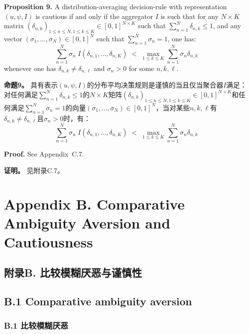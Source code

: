 \documentclass[12pt,a4paper]{article}
\newenvironment{original}
  {\par\noindent\ignorespaces}
  {\par}
\newenvironment{translation}
  {\par\noindent{\color{transblue}\ignorespaces}}
  {\par\medskip}
\begin{document}
\begin{original}
\textbf{Proposition 9.} A distribution-averaging decision-rule with representation $(u, \psi, I)$ is cautious if and only if the aggregator $I$ is such that for any $N \times K$ matrix $(\delta_{n,k})_{1 \leq n \leq N, 1 \leq k \leq K} \in [0,1]^{N \times K}$ such that $\sum_{n=1}^{N} \delta_{n,k} \leq 1$, and any vector $(\sigma_{1}, \dots, \sigma_{N}) \in [0,1]^{N}$ such that $\sum_{n=1}^{N} \sigma_{n} = 1$, one has:
\[
\sum_{n=1}^{N} \sigma_{n} \; I(\delta_{n,1}, \dots, \delta_{n,K}) \; < \; \max_{1 \leq k \leq K} \sum_{n=1}^{N} \sigma_{n} \delta_{n,k}
\]
whenever one has $\delta_{n,k} \neq \delta_{n,\ell}$ and $\sigma_{n} > 0$ for some $n, k, \ell$.
\end{original}

\begin{translation}
\textbf{命题9。} 具有表示$(u, \psi, I)$的分布平均决策规则是谨慎的当且仅当聚合器$I$满足：对任何满足$\sum_{n=1}^{N} \delta_{n,k} \leq 1$的$N \times K$矩阵$(\delta_{n,k})_{1 \leq n \leq N, 1 \leq k \leq K} \in [0,1]^{N \times K}$和任何满足$\sum_{n=1}^{N} \sigma_{n} = 1$的向量$(\sigma_{1}, \dots, \sigma_{N}) \in [0,1]^{N}$，当对某些$n, k, \ell$有$\delta_{n,k} \neq \delta_{n,\ell}$且$\sigma_{n} > 0$时，有：
\[
\sum_{n=1}^{N} \sigma_{n} \; I(\delta_{n,1}, \dots, \delta_{n,K}) \; < \; \max_{1 \leq k \leq K} \sum_{n=1}^{N} \sigma_{n} \delta_{n,k}
\]
\end{translation}

\begin{original}
\textbf{Proof.} See Appendix~C.7.
\end{original}

\begin{translation}
\textbf{证明。} 见附录C.7。
\end{translation}

\newpage
\section*{Appendix B. Comparative Ambiguity Aversion and Cautiousness}
{\color{transblue}\subsection*{附录B. 比较模糊厌恶与谨慎性}}

\subsection*{B.1 Comparative ambiguity aversion}
{\color{transblue}\subsubsection*{B.1 比较模糊厌恶}}
\end{document}
